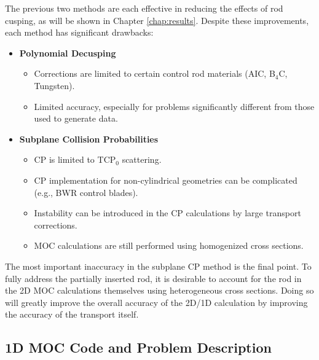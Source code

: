 The previous two methods are each effective in reducing the effects of rod cusping, as will be shown in Chapter \ref{chap:results}.  Despite these improvements, each method has significant drawbacks:
\begin{itemize}[leftmargin=*]
    \item \textbf{Polynomial Decusping}
    
    \begin{itemize}
        \item Corrections are limited to certain control rod materials (AIC, B$_4$C, Tungsten).
        \item Limited accuracy, especially for problems significantly different from those used to generate data.
    \end{itemize}

    \item \textbf{Subplane Collision Probabilities}
    
    \begin{itemize}
        \item CP is limited to TCP$_0$ scattering.
        \item CP implementation for non-cylindrical geometries can be complicated (e.g., BWR control blades).
        \item Instability can be introduced in the CP calculations by large transport corrections.
        \item MOC calculations are still performed using homogenized cross sections.
    \end{itemize}
\end{itemize}
The most important inaccuracy in the subplane CP method is the final point.  To fully address the partially inserted rod, it is desirable to account for the rod in the 2D MOC calculations themselves using heterogeneous cross sections.  Doing so will greatly improve the overall accuracy of the 2D/1D calculation by improving the accuracy of the transport itself.

\subsection{1D MOC Code and Problem Description}\label{ss:1dcode}

